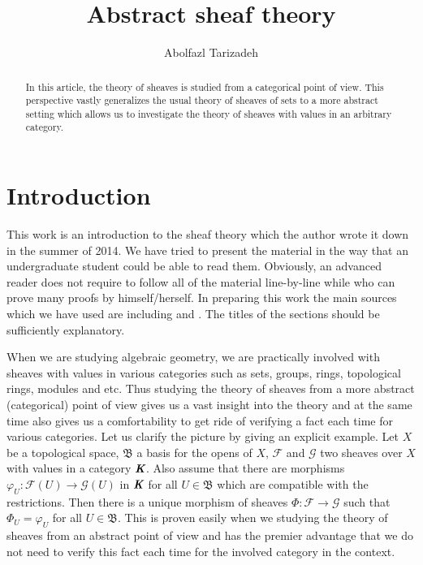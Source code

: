 \documentclass[12pt]{amsart}
\renewcommand{\phi}{\varphi}
\theoremstyle{definition}
\begin{document}
\title{Abstract sheaf theory}



\author{Abolfazl Tarizadeh}
\address{Department of Mathematics, Faculty of Basic Sciences, University of Maragheh \\
P. O. Box 55181-83111, Maragheh, Iran.
 }

\date{}



\begin{abstract} In this article, the theory of sheaves is studied from a categorical point of view. This perspective vastly generalizes the usual theory of sheaves of sets to a more abstract setting which allows us to investigate the theory of sheaves with values in an arbitrary category.
\end{abstract}


\maketitle

\section{Introduction}

This work is an introduction to the sheaf theory which the author wrote it down in the summer of 2014. We have tried to present the material in the way that an undergraduate student could be able to read them. Obviously, an advanced reader does not require to follow all of the material line-by-line while who can prove many proofs by himself/herself. In preparing this work the main sources which we have used are including \cite{Grothendieck} and \cite{Johan}. The titles of the sections should be sufficiently explanatory.


When we are studying algebraic geometry, we are practically involved with sheaves with values in various categories such as sets, groups, rings, topological rings, modules and etc. Thus studying the theory of sheaves from a more abstract (categorical) point of view gives us a vast insight into the theory and at the same time also gives us a comfortability to get ride of verifying a fact each time for various categories. Let us clarify the picture by giving an explicit example. Let $X$ be a topological space, $\mathfrak{B}$ a basis for the opens of $X$, $\mathscr{F}$ and $\mathscr{G}$ two sheaves over $X$ with values in a category $\emph{\textbf{K}}$. Also assume that there are morphisms $\phi_{U}:\mathscr{F}(U)\rightarrow\mathscr{G}(U)$ in $\emph{\textbf{K}}$ for all $U\in\mathfrak{B}$ which are compatible with the restrictions. Then there is a unique morphism of sheaves $\Phi:\mathscr{F}\rightarrow\mathscr{G}$ such that $\Phi_{U}=\phi_{U}$ for
all $U\in\mathfrak{B}$. This is proven easily when we studying the theory of sheaves from an abstract point of view and has the premier advantage that we do not need to verify this fact each time for the involved category in the context.
\end{document}
